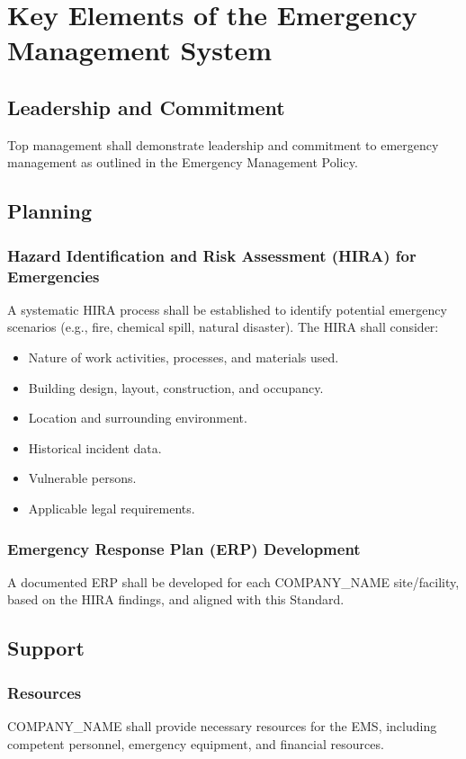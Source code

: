 \documentclass[12pt]{article}
\begin{document}
\section{Key Elements of the Emergency Management System}

\subsection{Leadership and Commitment}
Top management shall demonstrate leadership and commitment to emergency management as outlined in the Emergency Management Policy.

\subsection{Planning}

\subsubsection{Hazard Identification and Risk Assessment (HIRA) for Emergencies}
A systematic HIRA process shall be established to identify potential emergency scenarios (e.g., fire, chemical spill, natural disaster). The HIRA shall consider:
\begin{itemize}
    \item Nature of work activities, processes, and materials used.
    \item Building design, layout, construction, and occupancy.
    \item Location and surrounding environment.
    \item Historical incident data.
    \item Vulnerable persons.
    \item Applicable legal requirements.
\end{itemize}

\subsubsection{Emergency Response Plan (ERP) Development}
A documented ERP shall be developed for each {{COMPANY_NAME}} site/facility, based on the HIRA findings, and aligned with this Standard.

\subsection{Support}

\subsubsection{Resources}
{{COMPANY_NAME}} shall provide necessary resources for the EMS, including competent personnel, emergency equipment, and financial resources.
\end{document}
